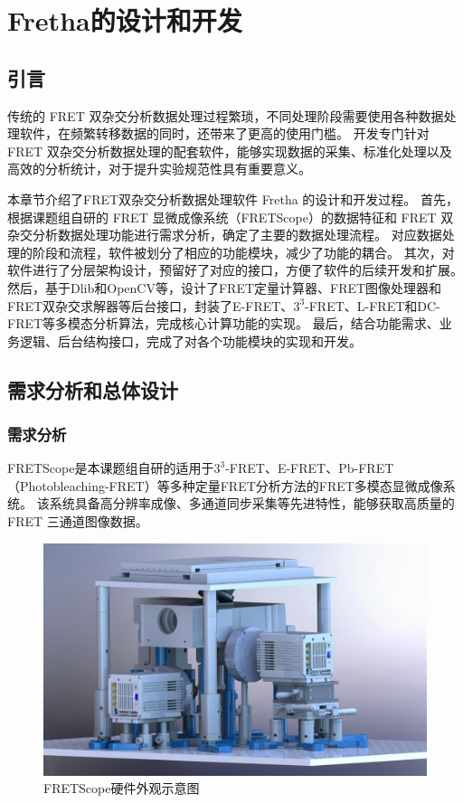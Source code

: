 \chapter{Fretha的设计和开发}

\section{引言}
传统的 FRET 双杂交分析数据处理过程繁琐，不同处理阶段需要使用各种数据处理软件，在频繁转移数据的同时，还带来了更高的使用门槛。
开发专门针对 FRET 双杂交分析数据处理的配套软件，能够实现数据的采集、标准化处理以及高效的分析统计，对于提升实验规范性具有重要意义。

本章节介绍了FRET双杂交分析数据处理软件 Fretha 的设计和开发过程。
首先，根据课题组自研的 FRET 显微成像系统（FRETScope）的数据特征和 FRET 双杂交分析数据处理功能进行需求分析，确定了主要的数据处理流程。
对应数据处理的阶段和流程，软件被划分了相应的功能模块，减少了功能的耦合。
其次，对软件进行了分层架构设计，预留好了对应的接口，方便了软件的后续开发和扩展。
然后，基于Dlib和OpenCV等，设计了FRET定量计算器、FRET图像处理器和FRET双杂交求解器等后台接口，封装了E-FRET、$3^3$-FRET、L-FRET和DC-FRET等多模态分析算法，完成核心计算功能的实现。
最后，结合功能需求、业务逻辑、后台结构接口，完成了对各个功能模块的实现和开发。

\section{需求分析和总体设计}

\subsection{需求分析}

\ifshowtext
FRETScope是本课题组自研的适用于$3^3$-FRET、E-FRET、Pb-FRET（Photobleaching-FRET）等多种定量FRET分析方法的FRET多模态显微成像系统。
该系统具备高分辨率成像、多通道同步采集等先进特性，能够获取高质量的 FRET 三通道图像数据。
\begin{figure}[hbtp]
  \centering
  \includegraphics[width=0.9\linewidth]{../figures/2/2_FRETScope2示意图.jpg}
  \caption{FRETScope硬件外观示意图}
  \label{fig:fretscope2硬件示意图}
\end{figure}

